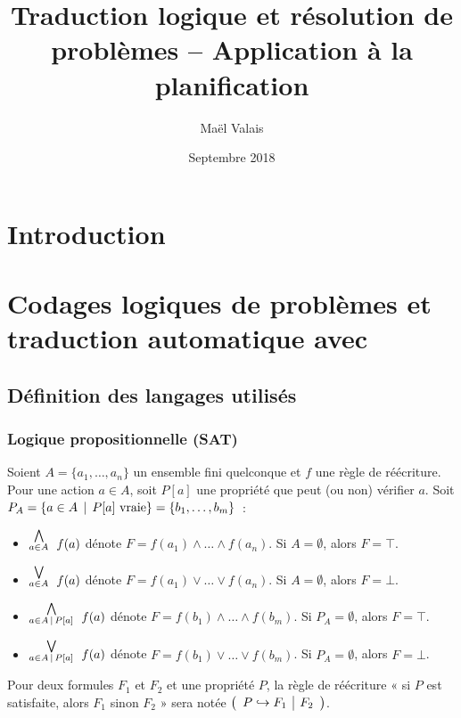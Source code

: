 \documentclass[a4paper,12pt,oneside]{extbook}
\title{Traduction logique et résolution de problèmes -- Application à la planification}
\author{Maël Valais}
\date{Septembre 2018}
\begin{document}
\tableofcontents

\chapter{Introduction}\label{chap:intro}




\chapter{Codages logiques de problèmes et traduction automatique avec \touist}\label{chap:codages}

\section{Définition des langages utilisés}
\subsection{Logique propositionnelle (SAT)}

{\color{red}

Soient $A=\{a_1, \ldots, a_n\}$ un ensemble fini quelconque et $f$ une règle de
réécriture.  Pour une action $a\in A$, soit $P[a]$ une propriété que peut (ou
non) vérifier $a$. Soit $P_A=\{a\in A \,\mid\, P[a]\
\mathrm{vraie}\}=\{b_1,\ldots,b_m\}$~:
\begin{itemize}
\item $\stackrel{\bigwedge}{_{a\in A}}~ f(a)$ dénote $F=f(a_1) \land\ldots\land f(a_n)$. Si $A=\emptyset$, alors $F=\top$.
\item $\stackrel{\bigvee}{_{a\in A}}~ f(a)$ dénote $F=f(a_1) \lor\ldots\lor f(a_n)$. Si $A=\emptyset$, alors $F=\bot$.
\item $\stackrel{\bigwedge}{_{a\in A \,\mid\, P[a]}}~ f(a)$ dénote $F=f(b_1) \land\ldots\land f(b_m)$. Si $P_A=\emptyset$, alors $F=\top$.
\item $\stackrel{\bigvee}{_{a\in A \,\mid\, P[a]}}~ f(a)$ dénote $F=f(b_1) \lor\ldots\lor f(b_m)$. Si $P_A=\emptyset$, alors $F=\bot$.
\end{itemize}

Pour deux formules $F_1$ et $F_2$ et une propriété $P$, la règle de réécriture
« si $P$ est satisfaite, alors $F_1$ sinon $F_2$ » sera notée
$\left(\begin{array}{l|l}{P}\hookrightarrow{F_1} & {F_2}\end{array}\right)$.
}
\end{document}
